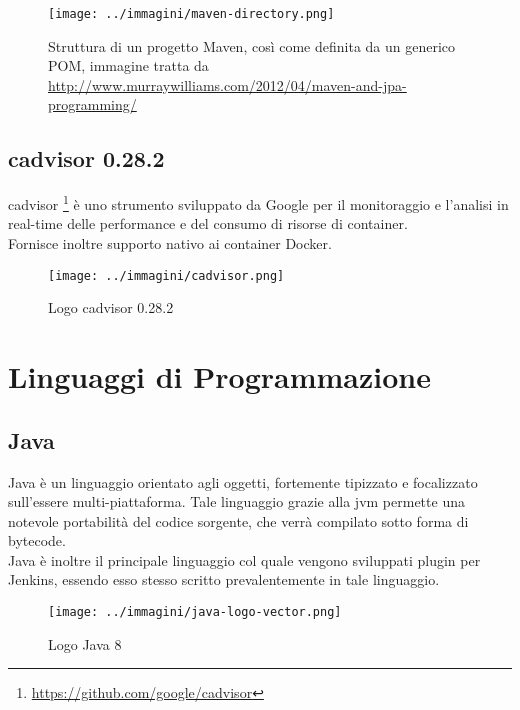 \begin{figure}[H]
    \capstart
    \centering
    \texttt{[image: ../immagini/maven-directory.png]}
    \caption[Struttura di un progetto Maven, così come definita da un generico POM]{Struttura di un progetto Maven, così come definita da un generico POM, immagine tratta da \url{http://www.murraywilliams.com/2012/04/maven-and-jpa-programming/}}
\end{figure}

\subsection{cadvisor 0.28.2}
\label{subsec:cadvisor}

cadvisor \footnote{\url{https://github.com/google/cadvisor}} è uno strumento sviluppato da Google per il monitoraggio e l'analisi in real-time delle performance e del consumo di risorse di \gls{container}. \\
Fornisce inoltre supporto nativo ai \gls{container} Docker.

\begin{figure}[H]
    \capstart
    \centering
    \texttt{[image: ../immagini/cadvisor.png]}
    \caption{Logo cadvisor 0.28.2}
\end{figure}

\section{Linguaggi di Programmazione}
\subsection{Java}

Java è un linguaggio orientato agli oggetti, fortemente tipizzato e focalizzato sull'essere multi-piattaforma. Tale linguaggio grazie alla \gls{jvm} permette una notevole portabilità del codice sorgente, che verrà compilato sotto forma di \gls{bytecode}. \\

Java è inoltre il principale linguaggio col quale vengono sviluppati \gls{plugin} per Jenkins\cite[Chapter~7]{jenkins-cookbook}, essendo esso stesso scritto prevalentemente in tale linguaggio.

\begin{figure}[H]
    \capstart
    \centering
    \texttt{[image: ../immagini/java-logo-vector.png]}
    \caption{Logo Java 8}
\end{figure}


